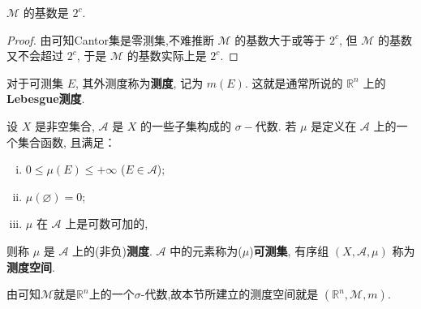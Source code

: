 \documentclass[../../main.tex]{subfiles}%
\begin{document}
\begin{proposition}\label{proposition:可测集类的基数是2^c}
\(\mathscr{M}\) 的基数是 \(2^c\).
\end{proposition}
\begin{proof}

由可知Cantor集是零测集,不难推断 \(\mathscr{M}\) 的基数大于或等于 \(2^c\), 但 \(\mathscr{M}\) 的基数又不会超过 \(2^c\), 于是 \(\mathscr{M}\) 的基数实际上是 \(2^c\). 

\end{proof}

\begin{definition}[Lebesgue测度]
对于可测集 \(E\), 其外测度称为\textbf{测度}, 记为 \(m(E)\). 这就是通常所说的 \(\mathbb{R}^n\) 上的 \textbf{Lebesgue测度}.
\end{definition}

\begin{definition}[测度]
设 \(X\) 是非空集合, \(\mathscr{A}\) 是 \(X\) 的一些子集构成的 \(\sigma -\)代数. 若 \(\mu\) 是定义在 \(\mathscr{A}\) 上的一个集合函数, 且满足：
\begin{enumerate}[(i)]
\item \(0 \leqslant  \mu(E) \leqslant  +\infty\) (\(E \in \mathscr{A}\));
\item \(\mu(\varnothing)=0\);
\item \(\mu\) 在 \(\mathscr{A}\) 上是可数可加的,
\end{enumerate}
则称 \(\mu\) 是 \(\mathscr{A}\) 上的(非负)\textbf{测度}. \(\mathscr{A}\) 中的元素称为(\(\mu\))\textbf{可测集}, 有序组 \((X, \mathscr{A}, \mu)\) 称为\textbf{测度空间}. 
\end{definition}
\begin{remark}
由可知$\mathscr{M}$就是$\mathbb{R}^n$上的一个$\sigma$-代数,故本节所建立的测度空间就是 \((\mathbb{R}^n, \mathscr{M}, m)\). 
\end{remark}
\end{document}
